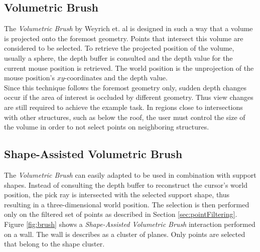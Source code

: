 \subsection{Volumetric Brush}

The \textit{Volumetric Brush} by Weyrich et. al\cite{weyrich2004post} is designed in such a way that a volume is projected onto the foremost geometry. Points that intersect this volume are considered to be selected. To retrieve the projected position of the volume, usually a sphere, the depth buffer is consulted and the depth value for the current mouse position is retrieved. The world position is the unprojection of the mouse position's $xy$-coordinates and the depth value. 
\\
Since this technique follows the foremost geometry only, sudden depth changes occur if the area of interest is occluded by different geometry. Thus view changes are still required to achieve the example task. In regions close to intersections with other structures, such as below the roof, the user must control the size of the volume in order to not select points on neighboring structures. 


\subsection{Shape-Assisted Volumetric Brush}
The \textit{Volumetric Brush} can easily adapted to be used in combination with support shapes. Instead of consulting the depth buffer to reconstruct the cursor’s world position, the pick ray is intersected with the selected support shape, thus resulting in a three-dimensional world position. The selection is then performed only on the filtered set of points as described in Section \ref{sec:pointFiltering}. 
Figure \ref{fig:brush} shows a \textit{Shape-Assisted Volumetric Brush} interaction performed on a wall. The wall is describes as a cluster of planes. Only points are selected that belong to the shape cluster. 

